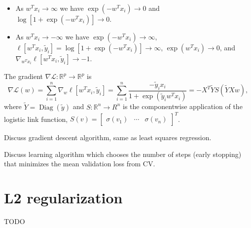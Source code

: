 \documentclass{article}
\DeclareMathOperator*{\Diag}{Diag}
\begin{document}
\begin{itemize}
\item As $w^T x_i\rightarrow \infty$ we have
  $\exp(-w^T x_i)\rightarrow 0$ and
  $\log [1+\exp(- w^T x_i)]\rightarrow 0$.
\item As $w^T x_i\rightarrow -\infty$ we have
  $\exp(-w^T x_i)\rightarrow \infty$,
  $\ell[w^T x_i, \tilde y_i] = \log [1+\exp(- w^T x_i)]\rightarrow \infty$,
  $\exp(w^T x_i)\rightarrow 0$, and $\nabla_{w^T x_i} \ell[w^T x_i, \tilde y_i] \rightarrow -1$.
\end{itemize}


The gradient $\nabla\mathcal L:\mathbb R^p\rightarrow\mathbb R^p$ is
\begin{equation*}
\nabla \mathcal L(w) = \sum_{i=1}^n \nabla_w \ell[w^T x_i, \tilde y_i] = 
\sum_{i=1}^n \frac{
  -\tilde y_i x_i
}{
  1+\exp(\tilde y_i w^T x_i)
} = -X^T \tilde Y S(\tilde Y X w),
\end{equation*}
where $\tilde Y=\Diag(\tilde y)$ and $S:\mathbb R^n\rightarrow R^n$ is the componentwise application
of the logistic link function,
$S(v) = \left[
    \begin{array}{ccc}
      \sigma(v_1) & \cdots & \sigma(v_n)
    \end{array}
\right]^T$.

Discuss gradient descent algorithm, same as least squares regression.

Discuss learning algorithm which chooses the number of steps (early
stopping) that minimizes the mean validation loss from CV.

\section{L2 regularization}

TODO
\end{document}
